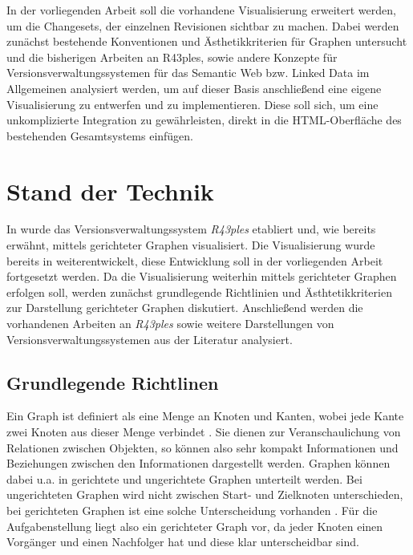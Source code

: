 \documentclass[color]{tudbook}
\begin{document}
In der vorliegenden Arbeit soll die vorhandene Visualisierung erweitert werden, um die Changesets, der einzelnen Revisionen sichtbar zu machen. Dabei werden zunächst bestehende Konventionen und Ästhetikkriterien für Graphen untersucht und die bisherigen Arbeiten an R43ples, sowie andere Konzepte für Versionsverwaltungssystemen für das Semantic Web bzw. Linked Data im Allgemeinen analysiert werden, um auf dieser Basis anschließend eine eigene Visualisierung zu entwerfen und zu implementieren. Diese soll sich, um eine unkomplizierte Integration zu gewährleisten, direkt in die HTML-Oberfläche des bestehenden Gesamtsystems einfügen.

\chapter{Stand der Technik}
In \cite{Graube} wurde das Versionsverwaltungssystem \textit{R43ples} etabliert und, wie bereits erwähnt, mittels gerichteter Graphen visualisiert. Die Visualisierung wurde bereits in \cite{Gruppe2.3,Gruppe2.1} weiterentwickelt, diese Entwicklung soll in der vorliegenden Arbeit fortgesetzt werden. Da die Visualisierung weiterhin mittels gerichteter Graphen erfolgen soll, werden zunächst grundlegende Richtlinien und Ästhtetikkriterien zur Darstellung gerichteter Graphen diskutiert. Anschließend werden die vorhandenen Arbeiten an \textit{R43ples} sowie weitere Darstellungen von Versionsverwaltungssystemen aus der Literatur analysiert.

\section{Grundlegende Richtlinen}
\label{sec:Richtlinien}
Ein Graph ist definiert als eine Menge an Knoten und Kanten, wobei jede Kante zwei Knoten aus dieser Menge verbindet \cite[Seite 2]{Graphenoptimierung}. Sie dienen zur Veranschaulichung von Relationen zwischen Objekten, so können also sehr kompakt Informationen und Beziehungen zwischen den Informationen dargestellt werden. Graphen können dabei u.a. in gerichtete und ungerichtete Graphen unterteilt werden. Bei ungerichteten Graphen wird nicht zwischen Start- und Zielknoten unterschieden, bei gerichteten Graphen ist eine solche Unterscheidung vorhanden \cite{diskreteMathematik}. Für die Aufgabenstellung liegt also ein gerichteter Graph vor, da jeder Knoten einen Vorgänger und einen Nachfolger hat und diese klar unterscheidbar sind.
\end{document}
